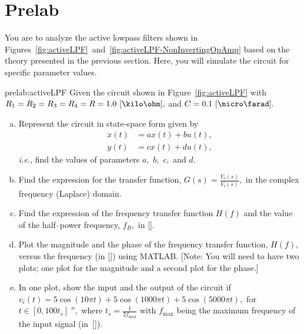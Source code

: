 \section{Prelab}
\label{sec:prelab}

You are to analyze the active lowpass filters  shown in Figures~\ref{fig:activeLPF}~and~\ref{fig:activeLPF-NonInvertingOpAmp} based on the theory presented in the previous section. Here, you will simulate the circuit for specific parameter values.


\begin{prelab}{prelab:activeLPF}
Given the circuit shown in Figure~\ref{fig:activeLPF} with $R_1 = R_2=R_3 = R_4=R=1.0~[\kilo\ohm],$ and $C = 0.1~[\micro\farad].$ 
      \begin{enumerate}[(a)]
      \item  Represent the circuit in state-space form given by 
        \begin{align*}
          \dot x(t) &= a x(t) + bu(t),\\
          y(t) &= cx(t) + du(t),
        \end{align*}
        \textit{i.e.}, find the values of parameters $a,$ $b,$ $c,$ and $d.$ 
      \item Find the expression for the transfer function, $G(s) = \frac{V_o(s)}{V_i(s)},$ in the complex frequency (Laplace) domain.
        
      \item Find the expression of the frequency transfer function $H(f)$ and the value of the half--power frequency, $f_B,$ in [\hertz].
      \item Plot the magnitude and the phase of the frequency transfer function, $H(f),$ versus the frequency (in [\hertz]) using MATLAB. [Note: You will need to have two plots; one plot for the magnitude and a second plot for the phase.]
      \item  In one plot, show the input and the output of the circuit if $v_i(t) = 5\cos(10\pi t) + 5\cos(1000\pi t) +5\cos(5000\pi t),$ for $t\in[0,100t_s]~\second,$ where $t_s=\frac{1}{2f_{\mathrm{max}}}$ with $f_{\mathrm{max}}$ being the maximum frequency of the input signal (in~[\hertz]).
        \end{enumerate}
\end{prelab}

